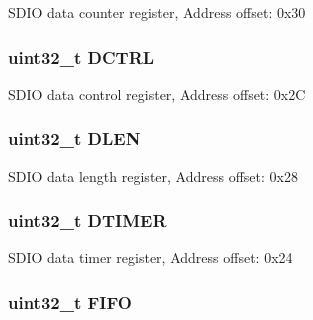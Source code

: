 S\-D\-I\-O data counter register, Address offset\-: 0x30 \hypertarget{struct_s_d_i_o___type_def_a96a3d1a050982fccc23c2e6dbe0de068}{
\subsubsection[{D\-C\-T\-R\-L}]{ uint32\-\_\-t D\-C\-T\-R\-L}}\label{struct_s_d_i_o___type_def_a96a3d1a050982fccc23c2e6dbe0de068}
S\-D\-I\-O data control register, Address offset\-: 0x2\-C \hypertarget{struct_s_d_i_o___type_def_a612edc78d2fa6288392f8ea32c36f7fb}{
\subsubsection[{D\-L\-E\-N}]{ uint32\-\_\-t D\-L\-E\-N}}\label{struct_s_d_i_o___type_def_a612edc78d2fa6288392f8ea32c36f7fb}
S\-D\-I\-O data length register, Address offset\-: 0x28 \hypertarget{struct_s_d_i_o___type_def_a1dd219eaeee8d9def822da843028bd02}{
\subsubsection[{D\-T\-I\-M\-E\-R}]{ uint32\-\_\-t D\-T\-I\-M\-E\-R}}\label{struct_s_d_i_o___type_def_a1dd219eaeee8d9def822da843028bd02}
S\-D\-I\-O data timer register, Address offset\-: 0x24 \hypertarget{struct_s_d_i_o___type_def_a68bef1da5fd164cf0f884b4209670dc8}{
\subsubsection[{F\-I\-F\-O}]{ uint32\-\_\-t F\-I\-F\-O}}\label{struct_s_d_i_o___type_def_a68bef1da5fd164cf0f884b4209670dc8}
